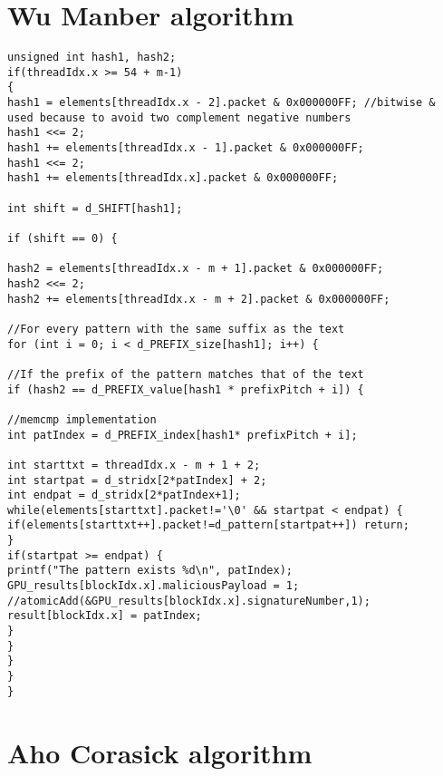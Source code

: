 \section{Wu Manber algorithm}
\begin{lstlisting}
unsigned int hash1, hash2;
if(threadIdx.x >= 54 + m-1)
{
hash1 = elements[threadIdx.x - 2].packet & 0x000000FF; //bitwise & used because to avoid two complement negative numbers
hash1 <<= 2;
hash1 += elements[threadIdx.x - 1].packet & 0x000000FF;
hash1 <<= 2;
hash1 += elements[threadIdx.x].packet & 0x000000FF;

int shift = d_SHIFT[hash1];

if (shift == 0) {

hash2 = elements[threadIdx.x - m + 1].packet & 0x000000FF;
hash2 <<= 2;
hash2 += elements[threadIdx.x - m + 2].packet & 0x000000FF;

//For every pattern with the same suffix as the text
for (int i = 0; i < d_PREFIX_size[hash1]; i++) {

//If the prefix of the pattern matches that of the text
if (hash2 == d_PREFIX_value[hash1 * prefixPitch + i]) {

//memcmp implementation
int patIndex = d_PREFIX_index[hash1* prefixPitch + i];

int starttxt = threadIdx.x - m + 1 + 2;
int startpat = d_stridx[2*patIndex] + 2;
int endpat = d_stridx[2*patIndex+1];
while(elements[starttxt].packet!='\0' && startpat < endpat) {
if(elements[starttxt++].packet!=d_pattern[startpat++]) return;
}
if(startpat >= endpat) { 
printf("The pattern exists %d\n", patIndex);
GPU_results[blockIdx.x].maliciousPayload = 1;
//atomicAdd(&GPU_results[blockIdx.x].signatureNumber,1);
result[blockIdx.x] = patIndex;
}
}
}
}
}
\end{lstlisting}

\section{Aho Corasick algorithm}
\begin{lstlisting}



\end{lstlisting}
